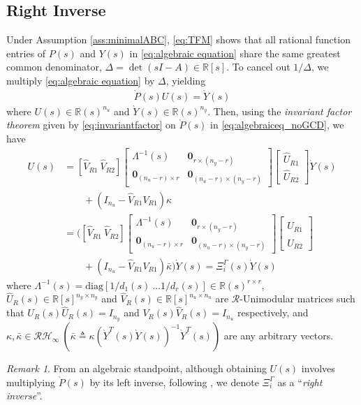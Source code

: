 \documentclass[10pt,a4paper]{amsart}
\theoremstyle{remark}
\newtheorem{remark}{Remark}
\begin{document}
\subsection{{Right Inverse}} \label{sec:leftinverse}
Under Assumption \ref{ass:minimalABC}, \eqref{eq:TFM} shows that all rational function entries of $P(s)$ and $Y(s)$ in \eqref{eq:algebraic equation} share the same greatest common denominator, $\Delta=\det (sI-A) \in \mathbb{R}[s]$. To cancel out $1/\Delta$, we multiply \eqref{eq:algebraic equation} by $\Delta$, yielding 
\begin{align} \label{eq:algebraiceq_noGCD}
    \grave{P}(s)U(s)= \grave{Y}(s)
\end{align}
where $U(s) \in \mathbb{R}(s)^{n_u}$ and $\grave{Y}(s) \in \mathbb{R}(s)^{n_y}$. Then, using the \textit{invariant factor theorem} given by \eqref{eq:invariantfactor} on $\grave{P}(s)$ in \eqref{eq:algebraiceq_noGCD}, we have
\begin{align} \label{eq:leftinverse}
U(s)&=[\hat{V}_{R1} \ \hat{V}_{R2}] \begin{bmatrix}
    \Lambda^{-1}(s) & \textbf{0}_{r \times (n_y-r)}\\
    \textbf{0}_{(n_u-r)\times r} & \textbf{0}_{(n_u-r)\times (n_y-r)}
\end{bmatrix}\begin{bmatrix}
    \hat{U}_{R1} \\
    \hat{U}_{R2}
\end{bmatrix}\grave{Y}(s)\nonumber\\& \qquad +(I_{n_u}-\hat{V}_{R1}{V}_{R1})\kappa \nonumber \\
&=\Biggr( [\hat{V}_{R1} \ \hat{V}_{R2}]  \begin{bmatrix}
    \Lambda^{-1}(s) & \textbf{0}_{r \times (n_y-r)}\\
    \textbf{0}_{(n_u-r)\times r} & \textbf{0}_{(n_u-r)\times (n_y-r)}
\end{bmatrix}\begin{bmatrix}
    \hat{U}_{R1} \\
    \hat{U}_{R2}
\end{bmatrix} \nonumber\\ & \qquad +(I_{n_u}-\hat{V}_{R1}{V}_{R1})\bar{\kappa}  \Biggr)\grave{Y}(s)= \Xi_i^{\Gamma}(s) \grave{Y}(s) 
\end{align}
where $\Lambda^{-1}(s)=\text{diag}[{1}/{d_1(s)} \ \dots {1}/{d_r(s)}] \in \mathbb{R}(s)^{r \times r}$,  $\hat{U}_R(s) \in \mathbb{R}[s]^{n_y \times n_y}$ and $\hat{V}_R(s) \in \mathbb{R}[s]^{n_u \times n_u}$ are $\mathcal{R}$-Unimodular matrices such that  ${U}_R(s)\hat{U}_R(s)=I_{n_y}$ and ${V}_R(s)\hat{V}_R(s)=I_{n_u}$ respectively, and $\kappa, \bar{\kappa} \in \mathcal{R}\mathcal{H}_\infty \  (\bar{\kappa}\triangleq \kappa(\grave{Y}^T(s)\grave{Y}(s))^{-1}\grave{Y}^T(s))$ are any arbitrary vectors. 
{\begin{remark}
From an algebraic standpoint, although obtaining $U(s)$ involves multiplying $\grave{P}(s)$ by its left inverse, following \cite{moylan1977stable,estrada2007left}, we denote $\Xi_i^\Gamma$ as a “\textit{right inverse}”.
\end{remark}}
\end{document}
